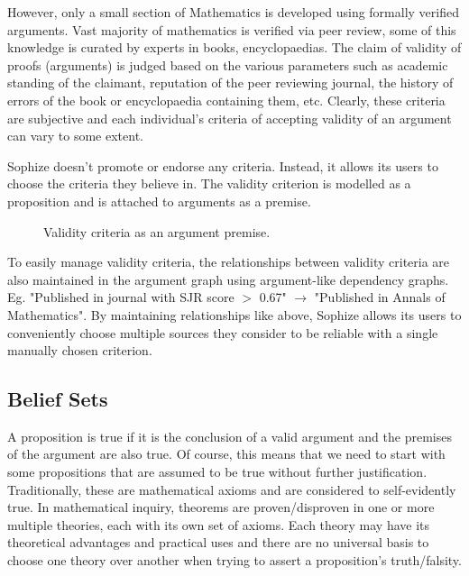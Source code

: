 \documentclass[runningheads]{llncs}
\begin{document}
However, only a small section of Mathematics is developed using formally verified arguments. Vast majority of mathematics is verified via peer review, some of this knowledge is curated by experts in books, encyclopaedias. The claim of validity of proofs (arguments) is judged based on the various parameters such as academic standing of the claimant, reputation of the peer reviewing journal, the history of errors of the book or encyclopaedia containing them, etc. Clearly, these criteria are subjective and each individual's criteria of accepting validity of an argument can vary to some extent.

Sophize doesn't promote or endorse any criteria. Instead, it allows its users to choose the criteria they believe in. The validity criterion is modelled as a proposition and is attached to arguments as a premise. 

\begin{figure}[!ht]
\begin{center}
\caption{Validity criteria as an argument premise.}
\label{validity_criterion}
\end{center}
\end{figure}

To easily manage validity criteria, the relationships between validity criteria are also maintained in the argument graph using argument-like dependency graphs. Eg. "Published in journal with SJR score $>$ 0.67" $\rightarrow$ "Published in Annals of Mathematics". By maintaining relationships like above, Sophize allows its users to conveniently choose multiple sources they consider to be reliable with a single manually chosen criterion. 

\subsection{Belief Sets}
\label{sec:bset}

A proposition is true if it is the conclusion of a valid argument and the premises of the argument are also true. Of course, this means that we need to start with some propositions that are assumed to be true without further justification. Traditionally, these are mathematical axioms and are considered to self-evidently true. In mathematical inquiry, theorems are proven/disproven in one or more multiple theories, each with its own set of axioms. Each theory may have its theoretical advantages and practical uses and there are no universal basis to choose one theory over another when trying to assert a proposition's truth/falsity.
\end{document}
